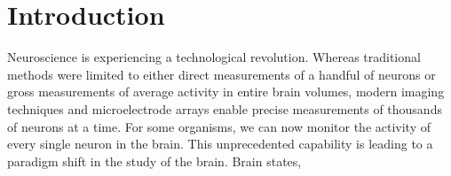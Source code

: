 \chapter{Introduction}
\label{introduction}


Neuroscience is experiencing a technological revolution. Whereas traditional 
methods were limited to either direct measurements of a handful of neurons 
or gross measurements of average activity in entire brain volumes, modern
imaging techniques and microelectrode arrays enable precise measurements
of thousands of neurons at a time. For some organisms, we can now
monitor the activity of every single neuron in the brain.  This unprecedented
capability is leading to a paradigm shift in the study of the brain. 
Brain states, 
 
